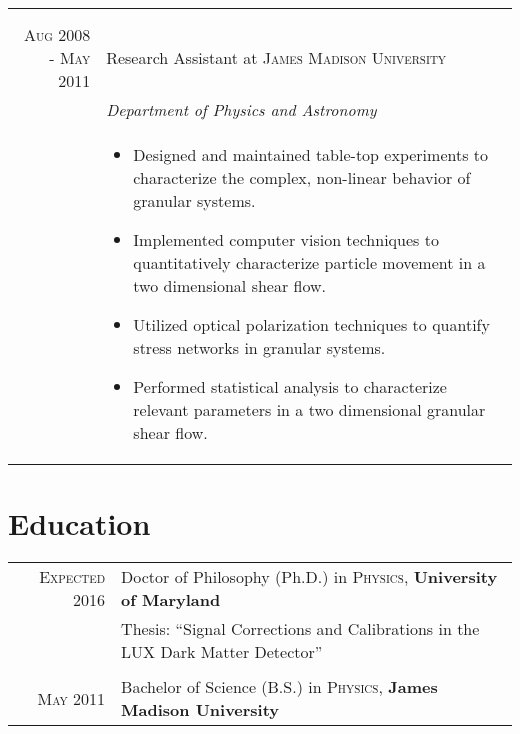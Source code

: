 \documentclass[a4paper,10pt]{article}
\begin{document}
\begin{tabular}{r|p{11cm}}
{ }\\
 \multicolumn{2}{c}{} \\
\textsc{Aug 2008 - May 2011} & Research Assistant at \textsc{James Madison University}\\&\emph{Department of Physics and Astronomy}\\&\footnotesize{
\begin{itemize}

\item Designed and maintained table-top experiments to characterize the complex, non-linear behavior of granular systems.
\item Implemented computer vision techniques to quantitatively characterize particle movement in a two dimensional shear flow.
\item Utilized optical polarization techniques to quantify stress networks in granular systems.
\item Performed statistical analysis to characterize relevant parameters in a two dimensional granular shear flow.

\end{itemize}
}\\
\end{tabular}

\section{Education}
\begin{tabular}{rl}	
 \textsc{Expected} 2016 & Doctor of Philosophy (Ph.D.) in \textsc{Physics}, \textbf{University of Maryland}\\
& Thesis: ``Signal Corrections and Calibrations in the LUX Dark Matter Detector'' \\&\\
\textsc{May} 2011& Bachelor of Science (B.S.) in \textsc{Physics}, \textbf{James Madison University} 
\end{tabular}

\end{document}
